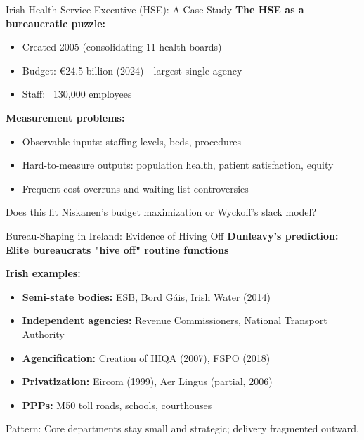 \documentclass[10pt]{beamer}
\begin{document}
\begin{frame}{Irish Health Service Executive (HSE): A Case Study}
\textbf{The HSE as a bureaucratic puzzle:}

\begin{itemize}
\item Created 2005 (consolidating 11 health boards)
\item Budget: €24.5 billion (2024) - largest single agency
\item Staff: ~130,000 employees
\end{itemize}


\textbf{Measurement problems:}
\begin{itemize}
\item Observable inputs: staffing levels, beds, procedures
\item Hard-to-measure outputs: population health, patient satisfaction, equity
\item Frequent cost overruns and waiting list controversies
\end{itemize}


\alert{Does this fit Niskanen's budget maximization or Wyckoff's slack model?}
\end{frame}

\begin{frame}{Bureau-Shaping in Ireland: Evidence of Hiving Off}
\textbf{Dunleavy's prediction: Elite bureaucrats "hive off" routine functions}


\textbf{Irish examples:}
\begin{itemize}
\item \textbf{Semi-state bodies:} ESB, Bord Gáis, Irish Water (2014)
\item \textbf{Independent agencies:} Revenue Commissioners, National Transport Authority
\item \textbf{Agencification:} Creation of HIQA (2007), FSPO (2018)
\item \textbf{Privatization:} Eircom (1999), Aer Lingus (partial, 2006)
\item \textbf{PPPs:} M50 toll roads, schools, courthouses
\end{itemize}


\alert{Pattern:} Core departments stay small and strategic; delivery fragmented outward.
\end{frame}
\end{document}
